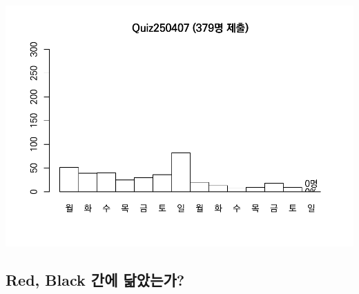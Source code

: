 \documentclass[
]{book}
\begin{document}
\includegraphics{_main_files/figure-latex/unnamed-chunk-165-1.pdf}

\subsection{Red, Black 간에 닮았는가?}\label{red-black-uxac04uxc5d0-uxb2eeuxc558uxb294uxac00-5}
\end{document}
